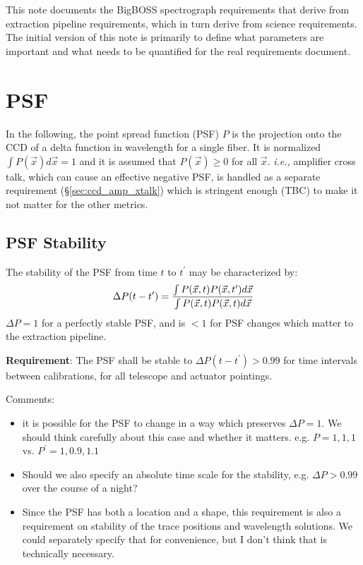 \documentclass[12pt]{article}
\begin{document}
\maketitle

This note documents the BigBOSS spectrograph requirements that derive
from extraction pipeline requirements, which in turn derive from
science requirements.  The initial version of this note is primarily
to define what parameters are important and what needs to be quantified
for the real requirements document.

\section{PSF}

In the following, the point spread function (PSF) $P$ is the projection
onto the CCD of a delta function in wavelength for a single fiber.
It is normalized $\int P(\vec x) d \vec x = 1$
and it is assumed that $P(\vec x) \ge 0$ for all $\vec x$.
{\it i.e.,} amplifier cross talk, which can cause an effective negative PSF,
is handled as a separate requirement (\S \ref{sec:ccd_amp_xtalk})
which is stringent enough (TBC) to make it not matter for the other metrics.

\subsection{PSF Stability}

The stability of the PSF from time $t$ to $t^\prime$ may be characterized by:
\begin{equation}
    \Delta P(t-t^\prime) =
        { \int P(\vec x, t) P(\vec x, t^\prime) d \vec x \over
          \int P(\vec x, t) P(\vec x, t) d \vec x }
\end{equation}
$\Delta P = 1$ for a perfectly stable PSF, and is $< 1$ for PSF changes
which matter to the extraction pipeline.

{\bf Requirement}: The PSF shall be stable to $\Delta P(t-t^\prime) > 0.99$
for time intervals between calibrations, for all telescope and actuator
pointings.

Comments:
\begin{itemize}
    \item it is possible for the PSF to change in a way which preserves
        $\Delta P = 1$.  We should think carefully about this case and
        whether it matters.  e.g. $P = 1, 1, 1$ vs. $P^\prime = 1, 0.9, 1.1$
    \item Should we also specify an absolute time scale for the stability,
        e.g. $\Delta P > 0.99$ over the course of a night?
    \item Since the PSF has both a location and a shape, this requirement is
        also a requirement on stability of the trace positions and wavelength
        solutions.  We could separately specify that for convenience, but
        I don't think that is technically necessary.
\end{itemize}
\end{document}
